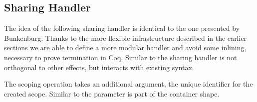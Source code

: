 \subsection{Sharing Handler}

The idea of the following sharing handler is identical to the one presented by
Bunkenburg.
Thanks to the more flexible infrastructure described in the earlier sections we
are able to define a more modular handler and avoid some inlining, necessary to
prove termination in Coq.
Similar to  the sharing handler is not orthogonal to other
effects, but interacts with existing  syntax.

The scoping operation  takes an additional argument, the
unique identifier for the created scope.
Similar to  the parameter is part of the container shape.

